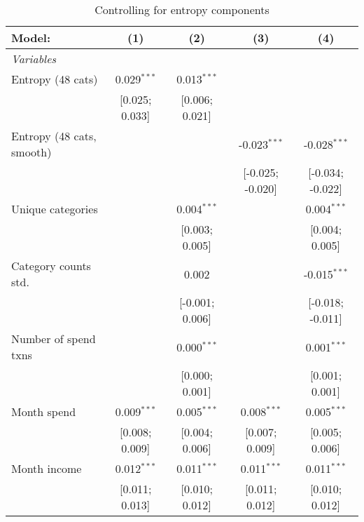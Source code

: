
\begin{table}[htbp]
   \centering
   \tiny
   \begin{threeparttable}[b]
      \caption{\label{tab:reg_has_inflows_comp} Controlling for entropy components}
      \begin{tabular}{lcccc}
         \tabularnewline \midrule \midrule
         Model:                    & (1)             & (2)             & (3)              & (4)\\  
         \midrule
         \emph{Variables}\\
         Entropy (48 cats)         & 0.029$^{***}$   & 0.013$^{***}$   &                  &   \\   
                                   & [0.025; 0.033]  & [0.006; 0.021]  &                  &   \\   
         Entropy (48 cats, smooth) &                 &                 & -0.023$^{***}$   & -0.028$^{***}$\\   
                                   &                 &                 & [-0.025; -0.020] & [-0.034; -0.022]\\   
         Unique categories         &                 & 0.004$^{***}$   &                  & 0.004$^{***}$\\   
                                   &                 & [0.003; 0.005]  &                  & [0.004; 0.005]\\   
         Category counts std.      &                 & 0.002           &                  & -0.015$^{***}$\\   
                                   &                 & [-0.001; 0.006] &                  & [-0.018; -0.011]\\   
         Number of spend txns      &                 & 0.000$^{***}$   &                  & 0.001$^{***}$\\   
                                   &                 & [0.000; 0.001]  &                  & [0.001; 0.001]\\   
         Month spend               & 0.009$^{***}$   & 0.005$^{***}$   & 0.008$^{***}$    & 0.005$^{***}$\\   
                                   & [0.008; 0.009]  & [0.004; 0.006]  & [0.007; 0.009]   & [0.005; 0.006]\\   
         Month income              & 0.012$^{***}$   & 0.011$^{***}$   & 0.011$^{***}$    & 0.011$^{***}$\\   
                                   & [0.011; 0.013]  & [0.010; 0.012]  & [0.011; 0.012]   & [0.010; 0.012]\\   

\end{tabular}
\end{threeparttable}
\end{table}
